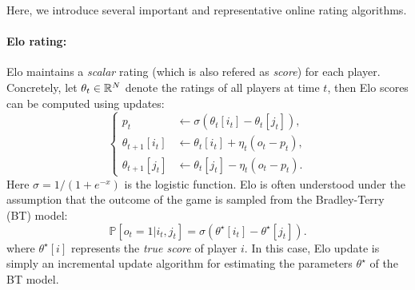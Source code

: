 
Here, we introduce several important and representative online rating algorithms.

\paragraph{Elo rating:} Elo maintains a \emph{scalar} rating (which is also refered as \emph{score}) for each player. Concretely, let $\theta_t\in\mathbb{R}^N$ denote the ratings of all players at time $t$, then Elo scores can be computed using updates:
\begin{equation}
\label{eq:elo}
    \begin{cases}
         p_t &\gets \sigma\left(\theta_t[i_t] - \theta_t[j_t]\right),\\
    \theta_{t+1}[i_t] &\gets \theta_{t}[i_t] + \eta_t \left(o_t - p_t\right),\\
    \theta_{t+1}[j_t] &\gets \theta_{t}[j_t] - \eta_t \left(o_t - p_t\right).
    \end{cases}
\end{equation}
Here $\sigma = 1/(1+e^{-x})$ is the logistic function. Elo is often understood under the assumption that the outcome of the game is sampled from the Bradley-Terry (BT) model:
\begin{equation}
\label{eq:bt}
    \mathbb{P}[o_t=1|i_t,j_t] = \sigma(\theta^\star[i_t]-\theta^\star[j_t]) \tag{Bradley-Terry}.
\end{equation}
where $\theta^\star[i]$ represents the \emph{true score} of player $i$. In this case, Elo update is simply an incremental update algorithm for estimating the parameters $\theta^\star$ of the BT model.


